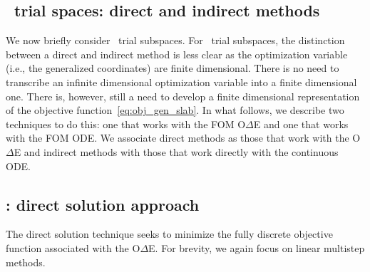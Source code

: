 \subsection{\spaceTimeAcronym\ trial spaces: direct and indirect methods}
We now briefly consider \spaceTimeAcronym\ trial subspaces. 
For \spaceTimeAcronym\ trial subspaces, the distinction between a direct and indirect method is less clear as the optimization variable (i.e., the generalized coordinates) are finite 
dimensional. There is no need to transcribe an infinite dimensional optimization variable into a finite dimensional one. There is, however, still a need to develop a finite 
dimensional representation of the objective function~\eqref{eq:obj_gen_slab}. In what follows, we describe two techniques to do this: one that works with the FOM O$\Delta$E and one that works with the FOM ODE. We associate direct methods as those 
that work with the O$\Delta$E and indirect methods with those that work directly with the continuous ODE.  

\subsection{\spaceTimeAcronym: direct solution approach}
The direct solution technique seeks to minimize the fully discrete objective function associated with the O$\Delta$E. For brevity, we again focus on linear multistep methods. 


